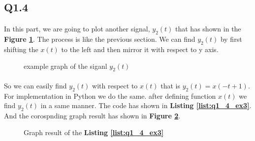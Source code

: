 \subsection{Q1.4}

\paragraph{}In this part, we are going to plot another
signal, $y_2(t)$ that has shown in the 
\textbf{Figure \ref{fig:ex3}}. The process is like 
the previous section. We can find $y_2(t)$ by first shifting 
the $x(t)$ to the left and then mirror it with respect 
to y axis.

\begin{figure}[H]
 \centering
{}
\caption{example graph of the siganl $y_2(t)$}
  \label{fig:ex3}
\end{figure}
\paragraph{}
So we can easily find $y_2(t)$ with respect to $x(t)$ 
that is $y_2(t) = x(-t+1)$. For implementation 
in Python we do the same. after defining function 
$x(t)$ we find $y_2(t)$ in a same manner. The code 
has shown in \textbf{Listing \ref{list:q1_4_ex3}}. And the 
corospnding graph result has shown in 
\textbf{Figure \ref{fig:Q1-4-ex3}}.

\begin{figure}[H]
  \centering
  \scalebox{0.6}{}
  \caption{Graph result of the \textbf{Listing \ref{list:q1_4_ex3}}}
  \label{fig:Q1-4-ex3}
\end{figure}
